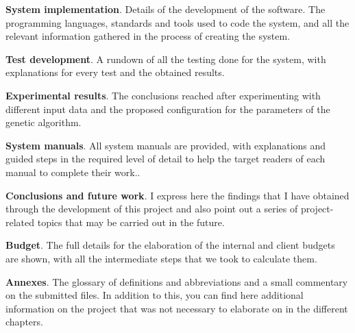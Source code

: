 \begin{description}
    \item \textbf{System implementation}. Details of the development of the software. The programming languages, standards and tools used to code the system, and all the relevant information gathered in the process of creating the system.

    \item \textbf{Test development}. A rundown of all the testing done for the system, with explanations for every test and the obtained results. 

    \item \textbf{Experimental results}. The conclusions reached after experimenting with different input data and the proposed configuration for the parameters of the genetic algorithm. 

    \item \textbf{System manuals}. All system manuals are provided, with explanations and guided steps in the required level of detail to help the target readers of each manual to complete their work..

    \item \textbf{Conclusions and future work}. I express here the findings that I have obtained through the development of this project and also point out a series of project-related topics that may be carried out in the future. 

    \item \textbf{Budget}. The full details for the elaboration of the internal and client budgets are shown, with all the intermediate steps that we took to calculate them. 

    \item \textbf{Annexes}. The glossary of definitions and abbreviations and a small commentary on the submitted files. In addition to this, you can find here additional information on the project that was not necessary to elaborate on in the different chapters. 

\end{description}

